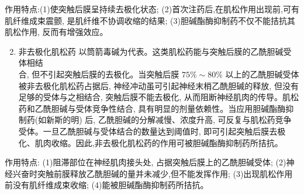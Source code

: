 \documentclass[10pt]{article}
\begin{document}
作用特点:(1)使突触后膜呈持续去极化状态; (2)首次注药后,在肌松作用出现前,可有肌纤维成束震颤, 是肌纤维不协调收缩的结果; (3)胆碱酯酶抑制药不仅不能拮抗其肌松作用, 反而有增强效应。

\begin{enumerate}
  \setcounter{enumi}{1}
  \item 非去极化肌松药 以筒箭毒碱为代表。这类肌松药能与突触后膜的乙酰胆碱受体相结\\
合, 但不引起突触后膜的去极化。当突触后膜 $75 \% \sim 80 \%$ 以上的乙酰胆碱受体被非去极化肌松药占据后, 神经冲动虽可引起神经末梢乙酰胆碱的释放, 但没有足够的受体与之相结合, 突触后膜不能去极化, 从而阻断神经肌肉的传导。肌松药和乙酰胆碱与受体竞争性结合, 具有明显的剂量依赖性。当应用胆碱酯酶抑制药(如新斯的明) 后, 乙酰胆碱的分解减慢、浓度升高, 可反复与肌松药竞争受体。一旦乙酰胆碱与受体结合的数量达到阈值时, 即可引起突触后膜去极化、肌肉收缩。因此,非去极化肌松药的作用可被胆碱酯酶抑制药所拮抗。
\end{enumerate}

作用特点: (1)阻滞部位在神经肌肉接头处, 占据突触后膜上的乙酰胆碱受体; (2)神经兴奋时突触前膜释放乙酰胆碱的量并未减少,但不能发挥作用; (3)出现肌松作用前没有肌纤维成束收缩; (4)能被胆碱酯酶抑制药所拮抗。
\end{document}
